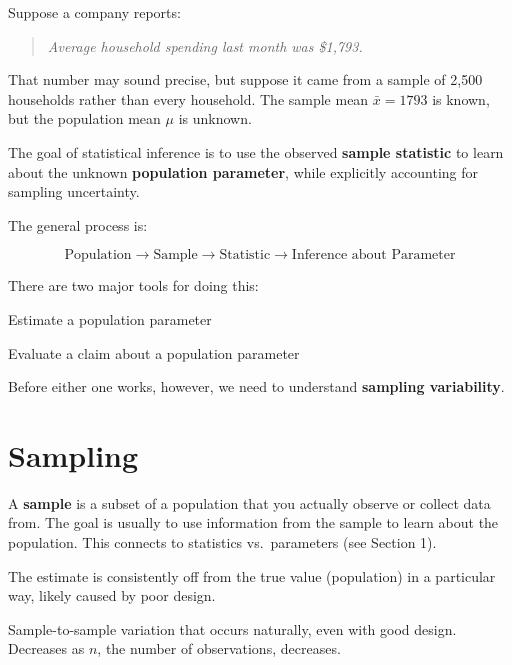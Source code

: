 \documentclass[
  letterpaper,
  DIV=11,
  numbers=noendperiod]{scrreprt}
\providecommand{\tightlist}{%
  \setlength{\itemsep}{0pt}\setlength{\parskip}{0pt}}
\begin{document}
Suppose a company reports:

\begin{quote}
\emph{Average household spending last month was \$1,793.}
\end{quote}

That number may sound precise, but suppose it came from a sample of
2,500 households rather than every household. The sample mean
\(\bar{x} = 1793\) is known, but the population mean \(\mu\) is unknown.

The goal of statistical inference is to use the observed \textbf{sample
statistic} to learn about the unknown \textbf{population parameter},
while explicitly accounting for sampling uncertainty.

The general process is:

\[\text{Population} \rightarrow \text{Sample} \rightarrow \text{Statistic} \rightarrow \text{Inference about Parameter}\]

There are two major tools for doing this:

\begin{description}
\tightlist
\item[Confidence intervals]
Estimate a population parameter
\item[Hypothesis tests]
Evaluate a claim about a population parameter
\end{description}

Before either one works, however, we need to understand \textbf{sampling
variability}.

\section{Sampling}\label{sampling}

A \textbf{sample} is a subset of a population that you actually observe
or collect data from. The goal is usually to use information from the
sample to learn about the population. This connects to statistics
vs.~parameters (see Section 1).

\begin{description}
\tightlist
\item[Bias]
The estimate is consistently off from the true value (population) in a
particular way, likely caused by poor design.
\item[Variance]
Sample-to-sample variation that occurs naturally, even with good design.
Decreases as \(n\), the number of observations, decreases.
\end{description}
\end{document}
